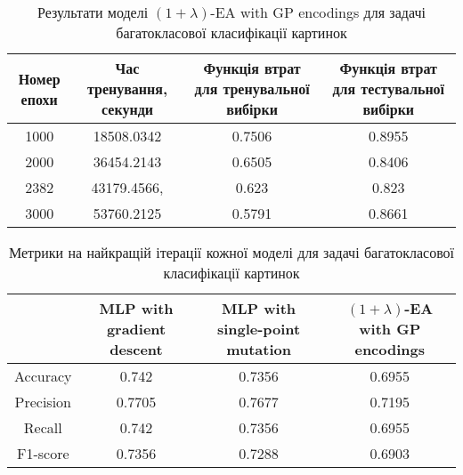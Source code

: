 \begin{table}[ht]
	\caption{Результати моделі $(1+\lambda)$-EA with GP encodings для задачі багатокласової класифікації картинок}
	\label{ea_mc_id_results}
	\centering
	\begin{adjustbox}{max width=\textwidth}
		\begin{tabular}{|c|c|c|c|}
			\hline 
			Номер епохи & Час тренування, секунди & Функція втрат для тренувальної вибірки & Функція втрат для тестувальної вибірки \\
			\hline 
			1000 & 18508.0342 & 0.7506 & 0.8955 \\
			\hline 
			2000 & 36454.2143 & 0.6505 & 0.8406 \\
			\hline
			2382 & 43179.4566, & 0.623 & 0.823 \\
			\hline
			3000 & 53760.2125 & 0.5791 & 0.8661 \\
			\hline
		\end{tabular}
	\end{adjustbox}
\end{table}

\begin{table}[ht]
	\caption{Метрики на найкращій ітерації кожної моделі для задачі багатокласової класифікації картинок}
	\label{metrics_mc_id_results}
	\centering
	\begin{adjustbox}{max width=\textwidth}
		\begin{tabular}{|c|c|c|c|}
			\hline 
			& MLP with gradient descent & MLP with single-point mutation & $(1+\lambda)$-EA with GP encodings \\
			\hline 
			Accuracy & 0.742 & 0.7356 & 0.6955 \\
			\hline 
			Precision & 0.7705 & 0.7677 & 0.7195 \\
			\hline
			Recall & 0.742 & 0.7356 & 0.6955 \\
			\hline
			F1-score & 0.7356 & 0.7288 & 0.6903 \\
			\hline
		\end{tabular}
	\end{adjustbox}
\end{table}

